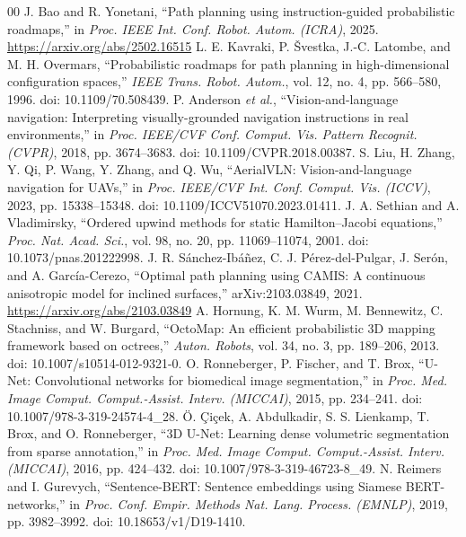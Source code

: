 \documentclass[conference]{IEEEtran}
\begin{document}
\begin{thebibliography}{00}
 J. Bao and R. Yonetani, ``Path planning using instruction-guided probabilistic roadmaps,'' in \textit{Proc. IEEE Int. Conf. Robot. Autom. (ICRA)}, 2025. \url{https://arxiv.org/abs/2502.16515}
 L. E. Kavraki, P. \v{S}vestka, J.-C. Latombe, and M. H. Overmars, ``Probabilistic roadmaps for path planning in high-dimensional configuration spaces,'' \textit{IEEE Trans. Robot. Autom.}, vol. 12, no. 4, pp. 566--580, 1996. doi: 10.1109/70.508439.
 P. Anderson \textit{et al.}, ``Vision-and-language navigation: Interpreting visually-grounded navigation instructions in real environments,'' in \textit{Proc. IEEE/CVF Conf. Comput. Vis. Pattern Recognit. (CVPR)}, 2018, pp. 3674--3683. doi: 10.1109/CVPR.2018.00387.
 S. Liu, H. Zhang, Y. Qi, P. Wang, Y. Zhang, and Q. Wu, ``AerialVLN: Vision-and-language navigation for UAVs,'' in \textit{Proc. IEEE/CVF Int. Conf. Comput. Vis. (ICCV)}, 2023, pp. 15338--15348. doi: 10.1109/ICCV51070.2023.01411.
 J. A. Sethian and A. Vladimirsky, ``Ordered upwind methods for static Hamilton--Jacobi equations,'' \textit{Proc. Nat. Acad. Sci.}, vol. 98, no. 20, pp. 11069--11074, 2001. doi: 10.1073/pnas.201222998.
 J. R. S\'anchez-Ib\'a\~nez, C. J. P\'erez-del-Pulgar, J. Ser\'on, and A. Garc\'ia-Cerezo, ``Optimal path planning using CAMIS: A continuous anisotropic model for inclined surfaces,'' arXiv:2103.03849, 2021. \url{https://arxiv.org/abs/2103.03849}
 A. Hornung, K. M. Wurm, M. Bennewitz, C. Stachniss, and W. Burgard, ``OctoMap: An efficient probabilistic 3D mapping framework based on octrees,'' \textit{Auton. Robots}, vol. 34, no. 3, pp. 189--206, 2013. doi: 10.1007/s10514-012-9321-0.
 O. Ronneberger, P. Fischer, and T. Brox, ``U-Net: Convolutional networks for biomedical image segmentation,'' in \textit{Proc. Med. Image Comput. Comput.-Assist. Interv. (MICCAI)}, 2015, pp. 234--241. doi: 10.1007/978-3-319-24574-4\_28.
 \"O. \c{C}i\c{c}ek, A. Abdulkadir, S. S. Lienkamp, T. Brox, and O. Ronneberger, ``3D U-Net: Learning dense volumetric segmentation from sparse annotation,'' in \textit{Proc. Med. Image Comput. Comput.-Assist. Interv. (MICCAI)}, 2016, pp. 424--432. doi: 10.1007/978-3-319-46723-8\_49.
 N. Reimers and I. Gurevych, ``Sentence-BERT: Sentence embeddings using Siamese BERT-networks,'' in \textit{Proc. Conf. Empir. Methods Nat. Lang. Process. (EMNLP)}, 2019, pp. 3982--3992. doi: 10.18653/v1/D19-1410.

\end{thebibliography}
\end{document}
